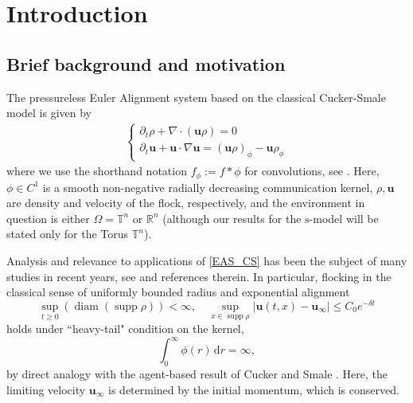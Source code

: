 \documentclass[11pt,letterpaper]{amsart}
\theoremstyle{plain}
\theoremstyle{definition}
\theoremstyle{remark}
\newcommand{\R}{\ensuremath{\mathbb{R}}}   %
\newcommand{\T}{\ensuremath{\mathbb{T}}}   %
\def \d {\delta}
\def \O {\Omega}
\DeclareMathOperator{\supp}{supp} %
\DeclareMathOperator{\diam}{diam} %
\renewcommand{\geq}{\geqslant}
\renewcommand{\leq}{\leqslant}
\def \dr  {\, \mbox{d}r}
\def\R{\mathbb{R}}
\def\T{\mathbb{T}}
\def\u{\textbf{u}}
\def \st {\mathrm{s}}
\begin{document}
\maketitle

\tableofcontents

\section{Introduction}
\subsection{Brief background and motivation}
The pressureless Euler Alignment system based on the classical Cucker-Smale model is given by 
\begin{align}
    \label{EAS_CS}
    \tag{CS}
    \begin{cases}
        \partial_t \rho + \nabla \cdot (\u \rho) = 0 \\
        \partial_t \u + \u \cdot \nabla \u = (\u\rho)_{\phi} - \u\rho_{\phi}
    \end{cases}
\end{align}
where we use the shorthand notation $f_{\phi} := f \ast \phi$ for convolutions, see \cite{CS2007a,HT2008}. Here, $\phi\in C^1$ is a smooth non-negative radially decreasing communication kernel, 
$\rho, \u$ are density and velocity of the flock, respectively, and the environment in question is either $\O = \T^n$ or $\R^n$ 
(although our results for the $\st$-model will be stated only for the Torus $\T^n$).

Analysis and relevance to applications of \eqref{EAS_CS} has been the subject of many studies in recent years, see \cite{ABFHKPPS,FK2019,HeT2017,Sbook,TT2014} and references therein. In particular, flocking in the classical sense of uniformly bounded radius and exponential alignment
\begin{equation}\label{e:flocking}
	\sup_{t\geq 0} (\diam(\supp \rho )) < \infty , \quad	\sup_{x \in\supp \rho} |\u(t,x) - \u_\infty|\leq C_0 e^{- \d t}
\end{equation}
holds under ``heavy-tail" condition on the kernel, \cite{TT2014}
\begin{equation}\label{ }
\int_0^\infty \phi(r) \dr = \infty,
\end{equation}
by direct analogy with the agent-based result of Cucker and Smale \cite{CS2007a,CS2007b,HL2009}. Here, the limiting velocity $\u_\infty$ is determined by the initial momentum, which is conserved.
\end{document}
